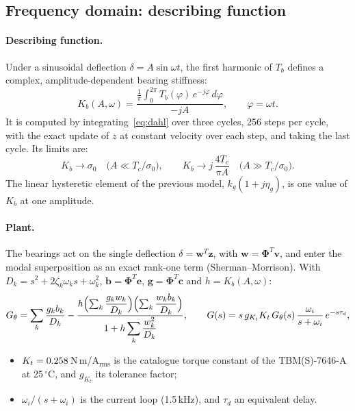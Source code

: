 \documentclass[10pt,a4paper]{article}
\numberwithin{equation}{section}
\begin{document}
\subsection{Frequency domain: describing function}\label{sec:df}
\paragraph{Describing function.} Under a sinusoidal deflection $\delta=A\sin\omega t$, the first harmonic of $T_b$ defines a complex, amplitude-dependent bearing stiffness:
\begin{equation}
K_b(A,\omega)=\frac{\frac{1}{\pi}\int_0^{2\pi}T_b(\varphi)\,e^{-j\varphi}\,d\varphi}{-jA},\qquad \varphi=\omega t .\label{eq:df}
\end{equation}
It is computed by integrating~\eqref{eq:dahl} over three cycles, 256 steps per cycle, with the exact update of $z$ at constant velocity over each step, and taking the last cycle. Its limits are:
\begin{equation}
K_b\to\sigma_0\quad\bigl(A\ll T_c/\sigma_0\bigr),\qquad K_b\to j\,\frac{4T_c}{\pi A}\quad\bigl(A\gg T_c/\sigma_0\bigr).
\end{equation}
The linear hysteretic element of the previous model, $k_g(1+j\eta_g)$, is one value of $K_b$ at one amplitude.

\paragraph{Plant.} The bearings act on the single deflection $\delta=\mathbf w^T\mathbf z$, with $\mathbf w=\bm\Phi^T\mathbf v$, and enter the modal superposition as an exact rank-one term (Sherman--Morrison). With $D_k=s^2+2\zeta_k\omega_ks+\omega_k^2$, $\mathbf b=\bm\Phi^T\mathbf e$, $\mathbf g=\bm\Phi^T\mathbf c$ and $h=K_b(A,\omega)$:
\begin{equation}
G_\theta=\sum_k\frac{g_kb_k}{D_k}-\frac{h\Bigl(\sum_k\dfrac{g_kw_k}{D_k}\Bigr)\Bigl(\sum_k\dfrac{w_kb_k}{D_k}\Bigr)}{1+h\displaystyle\sum_k\frac{w_k^2}{D_k}},\qquad
G(s)=s\,g_{K_t}K_t\,G_\theta(s)\,\frac{\omega_i}{s+\omega_i}\,e^{-s\tau_d}, \label{eq:plant}
\end{equation}
\begin{itemize}
\item $K_t=0.258$\,N\,m/A$_\mathrm{rms}$ is the catalogue torque constant of the TBM(S)-7646-A at 25\,$^\circ$C, and $g_{K_t}$ its tolerance factor;
\item $\omega_i/(s+\omega_i)$ is the current loop (1.5\,kHz), and $\tau_d$ an equivalent delay.
\end{itemize}
\end{document}
